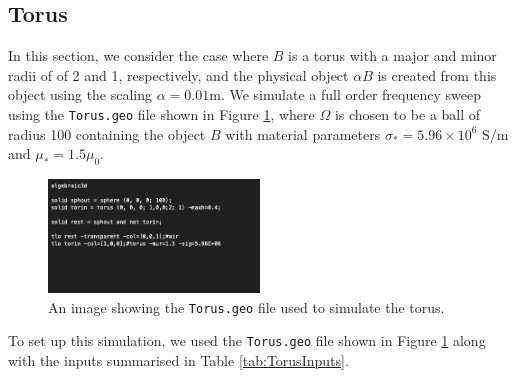 \subsection{Torus}
In this section, we consider the case where $B$  is a torus with a major and minor radii of  of 2 and  1, respectively, and the physical object $\alpha B$ is created from this object using the scaling $\alpha=0.01\text{m}$. We simulate a full order frequency sweep using the \texttt{Torus.geo} file shown in Figure \ref{fig:torus.geo}, where $\Omega$ is chosen to be a ball of radius 100 containing the object $B$ with material parameters $\sigma_*=5.96\times10^6\text{ S/m}$ and $\mu_*=1.5\mu_0$.
\begin{figure}[H]
\begin{center}
\includegraphics[width=0.5\textwidth]{Figures/TorusInput.png}
\caption{An image showing the \texttt{Torus.geo} file used to simulate the torus.}\label{fig:torus.geo}
\end{center}
\end{figure}
\noindent
To set up this simulation, we used the \texttt{Torus.geo} file shown in Figure \ref{fig:torus.geo} along with the inputs summarised in Table \ref{tab:TorusInputs}.
